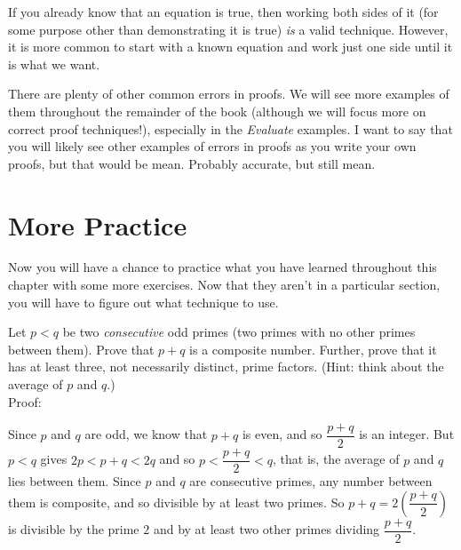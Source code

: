 \begin{rem}
If you already know that an equation is true, then working both sides of it 
(for some purpose other than demonstrating it is true) {\em is} a valid technique.
However, it is more common to start with a known equation 
and work just one side until it is what we want.
\end{rem}

There are plenty of other common errors in proofs.  We will see more examples of them throughout
the remainder of the book (although we will focus more on correct proof techniques!), 
especially in the {\em Evaluate} examples.
I want to say that you will likely see other examples of errors in proofs as you write your own proofs,
but that would be mean. Probably accurate, but still mean.

\newpage
\section{More Practice}\label{section:morePractice}
Now you will have a chance to practice what you have learned throughout this chapter with some more
exercises.  Now that they aren't in a particular section, you will have to figure out what technique to use.

\begin{exer}
Let $p<q$ be two {\em consecutive} odd primes (two primes with no other primes between them). 
Prove that $p+q$ is a composite number.  
Further, prove that it has at least three, not necessarily distinct, prime factors.
(Hint: think about the average of $p$ and $q$.)\\
Proof:\\
\vspace*{1.5in}
\begin{answer}
Since $p$ and $q$ are odd, we know that $p+q$ is even, and so
$\dfrac{p+q}{2}$ is an integer. But $p< q$ gives $2p < p+q < 2q $
and so $p < \dfrac{p+q}{2} < q$, that is, the average of $p$ and $q$
lies between them. Since $p$ and $q$ are consecutive primes, any
number between them is composite, and so divisible by at least two
primes. So $p+q = 2\left(\dfrac{p+q}{2}\right)$ is divisible by the
prime $2$ and by at least two other primes dividing
$\dfrac{p+q}{2}$.
\end{answer}
\end{exer}



